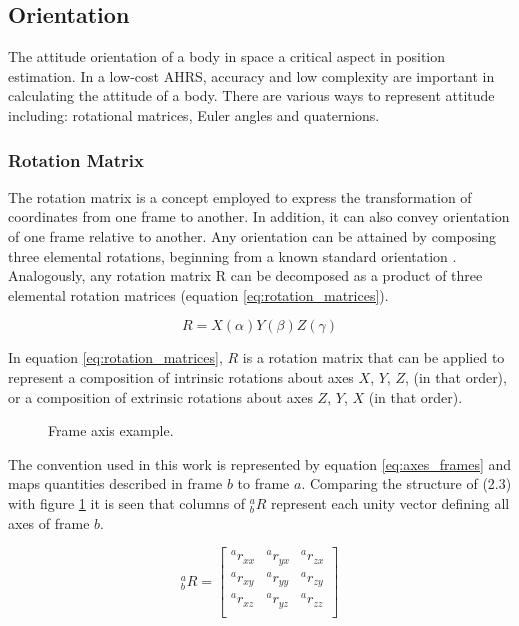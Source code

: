 \newpage
\subsection{Orientation}
\label{sub:orientation}

The attitude orientation of a body in space a critical aspect in position estimation. In a low-cost AHRS, accuracy and low complexity are important in calculating the attitude of a body. There are various ways to represent attitude including: rotational matrices, Euler angles and quaternions.

\subsubsection{Rotation Matrix}

The rotation matrix is a concept employed to express the transformation of coordinates from one frame to another. In addition, it can also convey orientation of one frame relative to another. Any orientation can be attained by composing three elemental rotations, beginning from a known standard orientation \cite{huynh2009metrics}. Analogously, any rotation matrix R can be decomposed as a product of three elemental rotation matrices (equation \ref{eq:rotation_matrices}).

\begin{equation}
  R = X(\alpha)Y(\beta)Z(\gamma)
  \label{eq:rotation_matrices}
\end{equation}

In equation \ref{eq:rotation_matrices}, $R$ is a rotation matrix that can be applied to represent a composition of intrinsic rotations about axes $X$, $Y$, $Z$, (in that order), or a composition of extrinsic rotations about axes $Z$, $Y$, $X$ (in that order).

\begin{figure}[!h]
  \centering
  \resizebox{0.44\linewidth}{!}{}
  \resizebox{0.54\linewidth}{!}{}
  \caption{Frame axis example.}
  \label{fig:axes_frames}
\end{figure}

The convention used in this work is represented by equation \ref{eq:axes_frames} and maps quantities described in frame $b$ to frame $a$. Comparing the structure of (2.3) with figure \ref{fig:axes_frames} it is seen that columns of $^a_bR$ represent each unity vector defining all axes of frame $b$.

\begin{equation}
  \textrm{$_{b}^{a}R$}
  =
  \begin{bmatrix}
    \textrm{$^{a}r_{xx}$} & \textrm{$^{a}r_{yx}$} & \textrm{$^{a}r_{zx}$} \\
    \textrm{$^{a}r_{xy}$} & \textrm{$^{a}r_{yy}$} & \textrm{$^{a}r_{zy}$} \\
    \textrm{$^{a}r_{xz}$} & \textrm{$^{a}r_{yz}$} & \textrm{$^{a}r_{zz}$} \\
  \end{bmatrix}
  \label{eq:axes_frames}
\end{equation}

